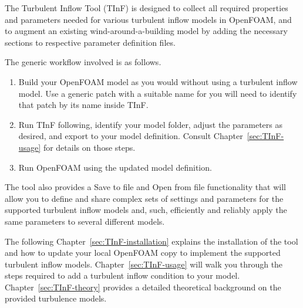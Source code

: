 
The Turbulent Inflow Tool (TInF) is designed to collect all required properties and parameters needed for various turbulent inflow models in OpenFOAM, and to augment an existing wind-around-a-building model by adding the necessary sections to respective parameter definition files.

The generic workflow involved is as follows.
\begin{enumerate}
\item
   Build your OpenFOAM model as you would without using a turbulent inflow model.  Use a generic patch with a suitable name for you will need to identify that patch by its name inside TInF.
   
\item
   Run TInF following, identify your model folder, adjust the parameters as desired, and export to your model definition.
   Consult Chapter~\ref{sec:TInF-usage} for details on those steps.
   
\item
    Run OpenFOAM using the updated model definition.
    
\end{enumerate}

The tool also provides a Save to file and Open from file functionality that will allow you to define and share complex sets of settings and parameters for the supported turbulent inflow models and, such, efficiently and reliably apply the same parameters to several different models.

\noindent
The following Chapter~\ref{sec:TInF-installation} explains the installation of the tool and how to update your local OpenFOAM copy to implement the supported turbulent inflow models.
Chapter~\ref{sec:TInF-usage} will walk you through the steps required to add a turbulent inflow condition to your model.
Chapter~\ref{sec:TInF-theory} provides a detailed theoretical background on the provided turbulence models.